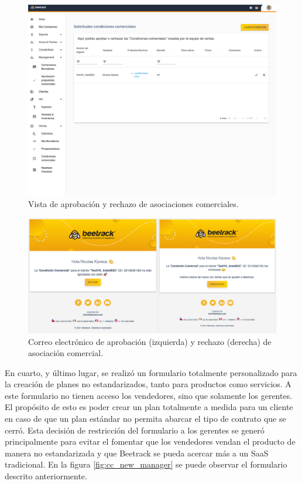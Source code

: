     \begin{figure}
      \centering
      \includegraphics[width=0.6\linewidth]{figures/cc/vistas/cc_review.png}
      \caption{Vista de aprobación y rechazo de asociaciones comerciales.}
      \label{fig:cc_review}
    \end{figure}

    \begin{figure}
      \centering
      \includegraphics[width=\linewidth]{figures/cc/mails/cc_approve_reject.jpeg}
      \caption{Correo electrónico de aprobación (izquierda) y rechazo (derecha) de asociación comercial.}
      \label{fig:cc_approve_reject}
    \end{figure}


    En cuarto, y último lugar, se realizó un formulario totalmente personalizado para la creación de planes no estandarizados, tanto para productos como servicios. A este formulario no tienen acceso los vendedores, sino que solamente los gerentes. El propósito de esto es poder crear un plan totalmente a medida para un cliente en caso de que un plan estándar no permita abarcar el tipo de contrato que se cerró. Esta decisión de restricción del formulario a los gerentes se generó principalmente para evitar el fomentar que los vendedores vendan el producto de manera no estandarizada y que Beetrack se pueda acercar más a un SaaS tradicional. En la figura \ref{fig:cc_new_manager} se puede observar el formulario descrito anteriormente.
 
